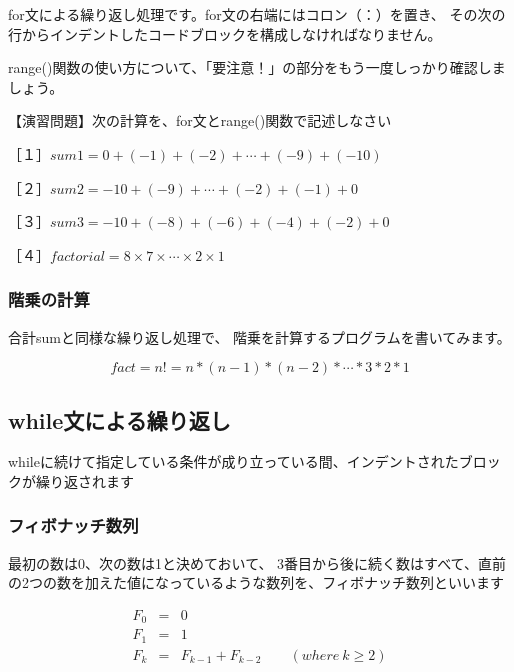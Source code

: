 \documentclass[uplatex,a4paper,11pt,oneside,openany]{jsbook}
\begin{document}

for文による繰り返し処理です。for文の右端にはコロン（：）を置き、
その次の行からインデントしたコードブロックを構成しなければなりません。

range()関数の使い方について、「要注意！」の部分をもう一度しっかり確認しましょう。



【演習問題】次の計算を、for文とrange()関数で記述しなさい

［１］$sum1 = 0 + (-1) + (-2) + \cdots + (-9) + (-10)$

［２］$sum2 = -10 + (-9) + \cdots + (-2) + (-1) + 0$

［３］$sum3 = -10 + (-8) + (-6) + (-4) + (-2) + 0$

［４］$factorial = 8 \times 7 \times \cdots \times 2 \times 1$

\subsubsection{階乗の計算}

合計sumと同様な繰り返し処理で、
階乗を計算するプログラムを書いてみます。

\[
fact = n! = n * ( n-1 ) * ( n-2 ) * \cdots * 3 * 2 * 1
\]



\subsection{while文による繰り返し}

whileに続けて指定している条件が成り立っている間、インデントされたブロックが繰り返されます

\subsubsection{フィボナッチ数列}

最初の数は0、次の数は1と決めておいて、
3番目から後に続く数はすべて、直前の2つの数を加えた値になっているような数列を、フィボナッチ数列といいます

\begin{eqnarray*}
F_0 &=& 0\\
F_1 &=& 1\\
F_{k} &=& F_{k-1} + F_{k-2} \qquad (where \ k \geq 2)
\end{eqnarray*}


\end{document}
